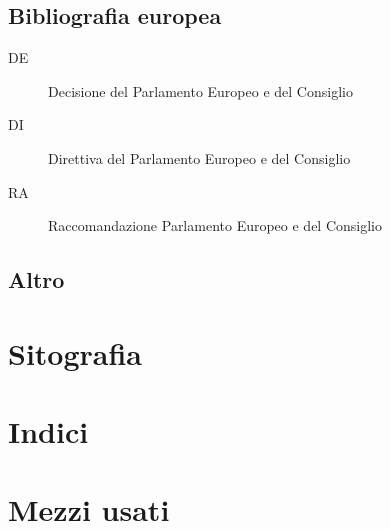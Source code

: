 \documentclass[a4paper]{book}%
\begin{document}
 \section{Bibliografia europea}
 \begin{description}
 	\item[DE] Decisione del Parlamento Europeo e del Consiglio
 	\item[DI] Direttiva del Parlamento Europeo e del Consiglio
 	\item[RA] Raccomandazione Parlamento Europeo e del Consiglio
 \end{description}
\printbibliography[keyword=EU,heading=subbibliography]
\section{Altro}
\printbibliography[keyword=EXTRA, heading=subbibliography]
\printbibliography[keyword=BOOK,title={Pubblicazioni}]
\chapter{Sitografia}
\printbibliography[keyword=WWW,type=online,restoreclassic,annotation=false,heading=subbibliography,title={Siti}]

\chapter{Indici}
\printindex
\printindex[due]
\backmatter
\appendix

\chapter{Mezzi usati}
\CDMezziUsati
\end{document}
